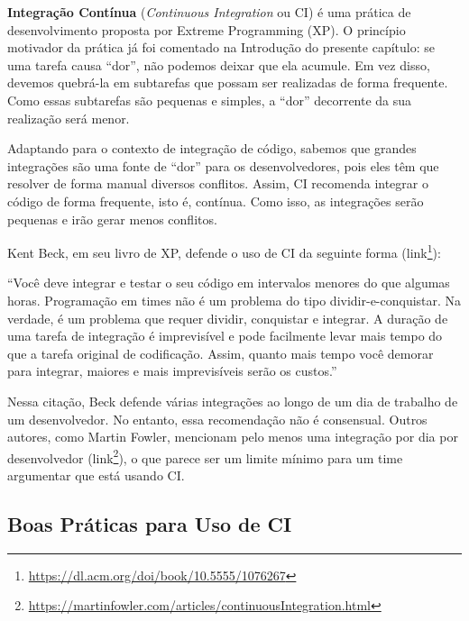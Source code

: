 \documentclass[
  11pt,
  twoside]{book}
\DeclareRobustCommand{\href}[2]{#2\footnote{\url{#1}}}
\renewenvironment{quote}{\centering \vspace{1.5ex} \begin{tcolorbox}[colback=backcolor, width=4.9in]}{\end{tcolorbox}}
\begin{document}

\textbf{Integração Contínua} (\emph{Continuous Integration} ou CI) é uma
prática de desenvolvimento proposta por Extreme Programming (XP). O
princípio motivador da prática já foi comentado na Introdução do
presente capítulo: se uma tarefa causa ``dor'', não podemos deixar que
ela acumule. Em vez disso, devemos quebrá-la em subtarefas que possam
ser realizadas de forma frequente. Como essas subtarefas são pequenas e
simples, a ``dor'' decorrente da sua realização será menor.

Adaptando para o contexto de integração de código, sabemos que grandes
integrações são uma fonte de ``dor'' para os desenvolvedores, pois eles
têm que resolver de forma manual diversos conflitos. Assim, CI recomenda
integrar o código de forma frequente, isto é, contínua. Como isso, as
integrações serão pequenas e irão gerar menos conflitos.

 Kent Beck, em seu livro de XP, defende o uso de CI da
seguinte forma
(\href{https://dl.acm.org/doi/book/10.5555/1076267}{link}):

\begin{quote}
``Você deve integrar e testar o seu código em intervalos menores do que
algumas horas. Programação em times não é um problema do tipo
dividir-e-conquistar. Na verdade, é um problema que requer dividir,
conquistar e integrar. A duração de uma tarefa de integração é
imprevisível e pode facilmente levar mais tempo do que a tarefa original
de codificação. Assim, quanto mais tempo você demorar para integrar,
maiores e mais imprevisíveis serão os custos.''
\end{quote}

 Nessa citação, Beck defende várias integrações ao
longo de um dia de trabalho de um desenvolvedor. No entanto, essa
recomendação não é consensual. Outros autores, como Martin Fowler,
mencionam pelo menos uma integração por dia por desenvolvedor
(\href{https://martinfowler.com/articles/continuousIntegration.html}{link}),
o que parece ser um limite mínimo para um time argumentar que está
usando CI.

\hypertarget{boas-pruxe1ticas-para-uso-de-ci}{%
\subsection{Boas Práticas para Uso de
CI}\label{boas-pruxe1ticas-para-uso-de-ci}}

\end{document}
